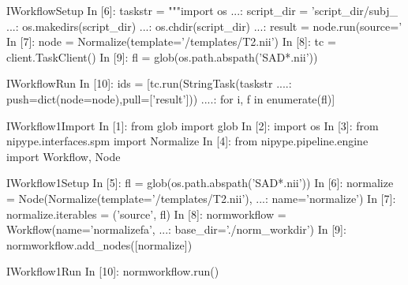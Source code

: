 \documentclass[portrait,final]{baposter}
\begin{document}
\begin{poster}
\begin{SaveVerbatim}{IWorkflowSetup}
In [6]: taskstr = """import os
   ...: script_dir = 'script_dir/subj_%
   ...: os.makedirs(script_dir)
   ...: os.chdir(script_dir)
   ...: result = node.run(source='%
In [7]: node = Normalize(template='/templates/T2.nii')
In [8]: tc = client.TaskClient()
In [9]: fl = glob(os.path.abspath('SAD*.nii'))
\end{SaveVerbatim}

\begin{SaveVerbatim}{IWorkflowRun}
In [10]: ids = [tc.run(StringTask(taskstr%
   ....:          push=dict(node=node),pull=['result']))
   ....:        for i, f in enumerate(fl)]
\end{SaveVerbatim}


\begin{SaveVerbatim}{IWorkflow1Import}
In [1]: from glob import glob
In [2]: import os
In [3]: from nipype.interfaces.spm import Normalize
In [4]: from nipype.pipeline.engine import Workflow, Node
\end{SaveVerbatim}

\begin{SaveVerbatim}{IWorkflow1Setup}
In [5]: fl = glob(os.path.abspath('SAD*.nii'))
In [6]: normalize = Node(Normalize(template='/templates/T2.nii'),
   ...:                  name='normalize')
In [7]: normalize.iterables = ('source', fl)
In [8]: normworkflow = Workflow(name='normalizefa',
   ...:                         base_dir='./norm_workdir')
In [9]: normworkflow.add_nodes([normalize])
\end{SaveVerbatim}

\begin{SaveVerbatim}{IWorkflow1Run}
In [10]: normworkflow.run()
\end{SaveVerbatim}


\end{poster}
\end{document}
